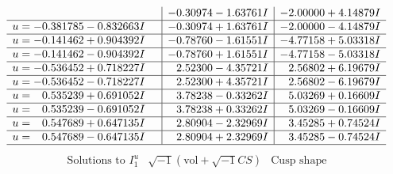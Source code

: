 \documentclass[1p]{elsarticle_modified}
\theoremstyle{definition}
\newcommand{\I}{\sqrt{-1}}
\begin{document}
$$\begin{array}{c|c|c}
 & -0.30974 - 1.63761 I & -2.00000 + 4.14879 I \\ \hline\begin{aligned}
u &= -0.381785 - 0.832663 I\end{aligned}
 & -0.30974 + 1.63761 I & -2.00000 - 4.14879 I \\ \hline\begin{aligned}
u &= -0.141462 + 0.904392 I\end{aligned}
 & -0.78760 - 1.61551 I & -4.77158 + 5.03318 I \\ \hline\begin{aligned}
u &= -0.141462 - 0.904392 I\end{aligned}
 & -0.78760 + 1.61551 I & -4.77158 - 5.03318 I \\ \hline\begin{aligned}
u &= -0.536452 + 0.718227 I\end{aligned}
 & \phantom{-}2.52300 - 4.35721 I & \phantom{-}2.56802 + 6.19679 I \\ \hline\begin{aligned}
u &= -0.536452 - 0.718227 I\end{aligned}
 & \phantom{-}2.52300 + 4.35721 I & \phantom{-}2.56802 - 6.19679 I \\ \hline\begin{aligned}
u &= \phantom{-}0.535239 + 0.691052 I\end{aligned}
 & \phantom{-}3.78238 - 0.33262 I & \phantom{-}5.03269 + 0.16609 I \\ \hline\begin{aligned}
u &= \phantom{-}0.535239 - 0.691052 I\end{aligned}
 & \phantom{-}3.78238 + 0.33262 I & \phantom{-}5.03269 - 0.16609 I \\ \hline\begin{aligned}
u &= \phantom{-}0.547689 + 0.647135 I\end{aligned}
 & \phantom{-}2.80904 - 2.32969 I & \phantom{-}3.45285 + 0.74524 I \\ \hline\begin{aligned}
u &= \phantom{-}0.547689 - 0.647135 I\end{aligned}
 & \phantom{-}2.80904 + 2.32969 I & \phantom{-}3.45285 - 0.74524 I\\
 \hline 
 \end{array}$$\newpage$$\begin{array}{c|c|c}  
\text{Solutions to }I^u_{1}& \I (\text{vol} + \sqrt{-1}CS) & \text{Cusp shape}\\

\end{array}$$
\end{document}
